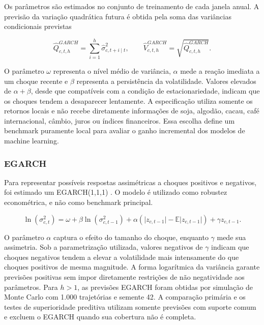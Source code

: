 \documentclass[a4paper,fleqn]{cas-sc}
\begin{document}
Os parâmetros são estimados no conjunto de treinamento de cada janela anual. A previsão da variação quadrática futura é obtida pela soma das variâncias condicionais previstas

\begin{equation}
\widehat{Q}^{GARCH}_{c,t,h}
=
\sum_{i=1}^{h}\widehat{\sigma}_{c,t+i\mid t}^{2},
\qquad
\widehat{V}^{GARCH}_{c,t,h}
=
\sqrt{\widehat{Q}^{GARCH}_{c,t,h}}.
\label{eq:garch_forecast}
\end{equation}

O parâmetro \(\omega\) representa o nível médio de variância, \(\alpha\) mede a reação imediata a um choque recente e \(\beta\) representa a persistência da volatilidade. Valores elevados de \(\alpha+\beta\), desde que compatíveis com a condição de estacionariedade, indicam que os choques tendem a desaparecer lentamente. A especificação utiliza somente os retornos locais e não recebe diretamente informações de soja, algodão, cacau, café internacional, câmbio, juros ou índices financeiros. Essa escolha define um benchmark puramente local para avaliar o ganho incremental dos modelos de machine learning.

\subsubsection{EGARCH}

Para representar possíveis respostas assimétricas a choques positivos e negativos, foi estimado um EGARCH(1,1,1) \citep{Nelson1991EGARCH}. O modelo é utilizado como robustez econométrica, e não como benchmark principal.

\begin{equation}
\ln\left(\sigma_{c,t}^{2}\right)
=
\omega
+\beta\ln\left(\sigma_{c,t-1}^{2}\right)
+\alpha\left(\lvert z_{c,t-1}\rvert-\mathbb{E}\lvert z_{c,t-1}\rvert\right)
+\gamma z_{c,t-1}.
\label{eq:egarch}
\end{equation}

O parâmetro \(\alpha\) captura o efeito do tamanho do choque, enquanto \(\gamma\) mede sua assimetria. Sob a parametrização utilizada, valores negativos de \(\gamma\) indicam que choques negativos tendem a elevar a volatilidade mais intensamente do que choques positivos de mesma magnitude. A forma logarítmica da variância garante previsões positivas sem impor diretamente restrições de não negatividade aos parâmetros. Para \(h>1\), as previsões EGARCH foram obtidas por simulação de Monte Carlo com 1.000 trajetórias e semente 42. A comparação primária e os testes de superioridade preditiva utilizam somente previsões com suporte comum e excluem o EGARCH quando sua cobertura não é completa.
\end{document}
